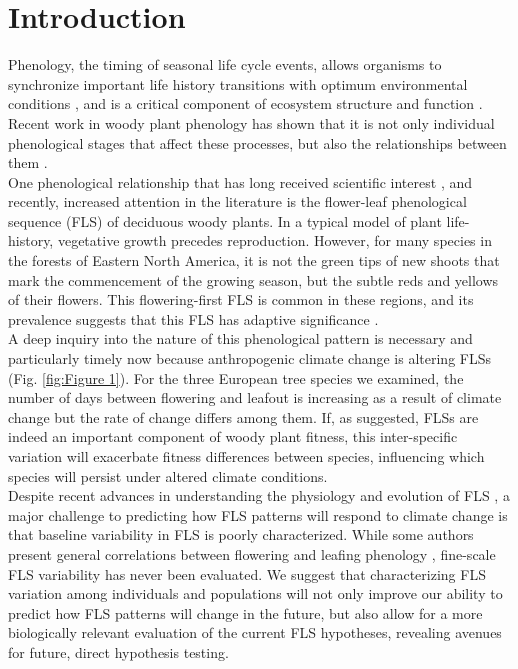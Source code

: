 \documentclass[12pt]{article}
\begin{document}
\section*{Introduction}
\indent \indent Phenology, the timing of seasonal life cycle events, allows organisms to synchronize important life history transitions with optimum environmental conditions \citep{Forrest2010}, and is a critical component of ecosystem structure and function \citep{Cleland2007,Piao2007}. Recent work in woody plant phenology has shown that it is not only individual phenological stages that affect these processes, but also the relationships between them \citep{Ettinger2018}.\\
\indent One phenological relationship that has long received scientific interest \citep[see][]{Robertson1895}, and recently, increased attention in the literature \citep{Savage2019, Gougherty2018} is the flower-leaf phenological sequence (FLS) of deciduous woody plants. In a typical model of plant life-history, vegetative growth precedes reproduction. However, for many species in the forests of Eastern North America, it is not the green tips of new shoots that mark the commencement of the growing season, but the subtle reds and yellows of their flowers. This flowering-first FLS is common in these regions, and its prevalence suggests that this FLS has adaptive significance \citep{Rathcke_1985}.\\ 

\indent A deep inquiry into the nature of this phenological pattern is necessary and particularly timely now because anthropogenic climate change is altering FLSs (Fig. \ref{fig:Figure 1}). For the three European tree species we examined, the number of days between flowering and leafout is increasing as a result of climate change but the rate of change differs among them.  If, as suggested, FLSs are indeed an important component of woody plant fitness, this inter-specific variation will exacerbate fitness differences between species, influencing which species will persist under altered climate conditions.\\

\indent Despite recent advances in understanding the physiology and evolution of FLS \citep{Gougherty2018,Savage2019}, a major challenge to predicting how FLS patterns will respond to climate change is that baseline variability in FLS is poorly characterized. While some authors present general correlations between flowering and leafing phenology \citep{Lechowicz_1995, Ettinger2018}, fine-scale FLS variability has never been evaluated. We suggest that characterizing FLS variation among individuals and populations will not only improve our ability to predict how FLS patterns will change in the future, but also allow for a more biologically relevant evaluation of the current FLS hypotheses, revealing avenues for future, direct hypothesis testing.\\
\end{document}
